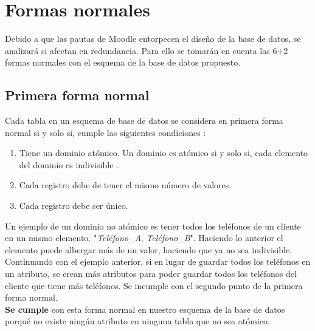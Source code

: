 \section{Formas normales}

%
    Debido a que las pautas de Moodle entorpecen el diseño de la base de datos, se analizará si afectan en redundancia. Para ello se tomarán en cuenta las 6+2 formas normales con el esquema de la base de datos propuesto.
%   
\subsection*{Primera forma normal}
    
    Cada tabla en un esquema de base de datos se considera en primera forma normal si y solo si, cumple las siguientes condiciones \cite[pág. 154]{libroBaseDeDatosIngles}: 
    
    \begin{enumerate}
        \item Tiene un dominio atómico. Un dominio es atómico si y solo si, cada elemento del dominio es indivisible \cite[pág. 161]{libroBaseDeDatosEspaniol}.
        \item Cada registro debe de tener el mismo número de valores.
        \item Cada registro debe ser único.
    \end{enumerate}  
    
    \noindent Un ejemplo de un dominio no atómico es tener todos los teléfonos de un cliente en un mismo elemento. "\textit{Teléfono\_A},  \textit{Teléfono\_B}".  Haciendo lo anterior el elemento puede albergar más de un valor, haciendo que ya no sea indivisible.\\
    
    \noindent Continuando con el ejemplo anterior, si en lugar de guardar todos los teléfonos en un atributo, se crean más atributos para poder guardar todos los teléfonos del cliente que tiene más teléfonos. Se incumple con el segundo punto de la primera forma normal.\\
    
    
    \noindent \textbf{Se cumple} con esta forma normal en nuestro esquema de la base de datos porqué no existe ningún atributo en ninguna tabla que no sea atómico.
    

